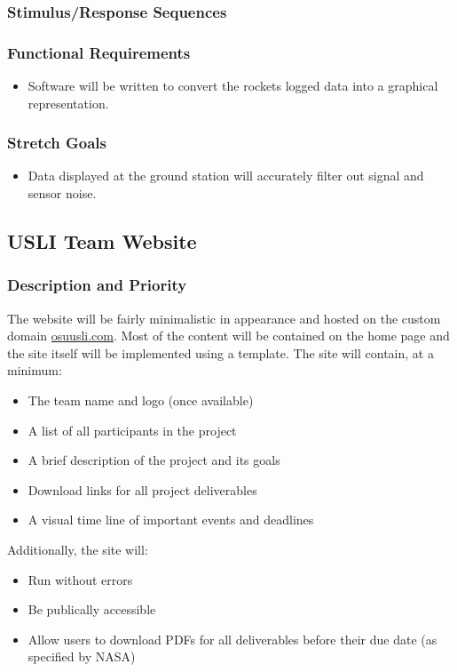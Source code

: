 \documentclass[onecolumn, draftclsnofoot, 10pt, compsoc]{IEEEtran}
\begin{document}
\subsubsection{Stimulus/Response Sequences}

\subsubsection{Functional Requirements}
\begin{itemize}
\item Software will be written to convert the rockets logged data into a graphical representation.
\end{itemize}
\subsubsection{Stretch Goals}
\begin{itemize}
\item Data displayed at the ground station will accurately filter out signal and sensor noise.
\end{itemize}


\subsection{USLI Team Website}
\subsubsection{Description and Priority}
The website will be fairly minimalistic in appearance and hosted on the custom domain \href{http://osuusli.com/}{osuusli.com}. Most of the content will be contained on the home page and the site itself will be implemented using a template. The site will contain, at a minimum:
\begin{itemize}
\item The team name and logo (once available)
\item A list of all participants in the project
\item A brief description of the project and its goals
\item Download links for all project deliverables
\item A visual time line of important events and deadlines
\end{itemize}
Additionally, the site will:
\begin{itemize}
\item Run without errors
\item Be publically accessible
\item Allow users to download PDFs for all deliverables before their due date (as specified by NASA)
\end{itemize}
\end{document}
